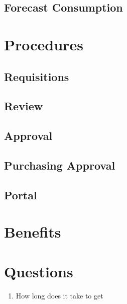 \documentclass[letterpaper,10pt,english]{sphinxmanual}
\begin{document}
\section{Forecast Consumption}
\label{BusinessProcessReengineering:forecast-consumption}

\chapter{Procedures}
\label{BusinessProcessReengineering:procedures}

\section{Requisitions}
\label{BusinessProcessReengineering:requisitions}

\section{Review}
\label{BusinessProcessReengineering:review}

\section{Approval}
\label{BusinessProcessReengineering:approval}

\section{Purchasing Approval}
\label{BusinessProcessReengineering:purchasing-approval}

\section{Portal}
\label{BusinessProcessReengineering:portal}

\chapter{Benefits}
\label{BusinessProcessReengineering:benefits}

\chapter{Questions}
\label{BusinessProcessReengineering:questions}\begin{enumerate}
\item {} 
How long does it take to get

\end{enumerate}
\end{document}
